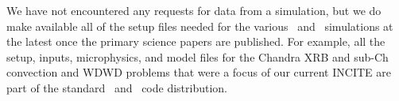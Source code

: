 \documentclass[11pt,letterpaper,english]{article}
\begin{document}

We have not encountered any requests for data from a simulation, but
we do make available all of the setup files needed for the various
\maestro\ and \castro\ simulations at the latest once the primary
science papers are published.  For example, all the setup, inputs,
microphysics, and model files for the Chandra XRB and sub-Ch
convection and WDWD problems that were a focus of our current INCITE
are part of the standard \maestro\ and \castro\ code distribution.














\end{document}

